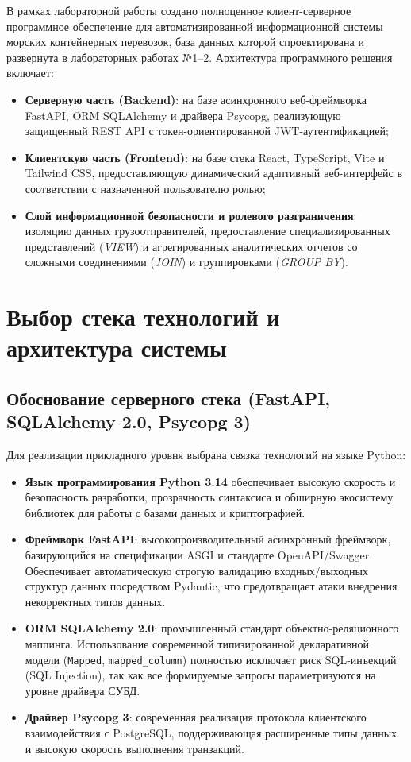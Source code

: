 \documentclass[a4paper,14pt]{article}
\begin{document}
В рамках лабораторной работы создано полноценное клиент-серверное программное обеспечение для автоматизированной информационной системы морских контейнерных перевозок, база данных которой спроектирована и развернута в лабораторных работах №1--2. Архитектура программного решения включает:
\begin{itemize}
    \item \textbf{Серверную часть (Backend)}: на базе асинхронного веб-фреймворка FastAPI, ORM SQLAlchemy и драйвера Psycopg, реализующую защищенный REST API с токен-ориентированной JWT-аутентификацией;
    \item \textbf{Клиентскую часть (Frontend)}: на базе стека React, TypeScript, Vite и Tailwind CSS, предоставляющую динамический адаптивный веб-интерфейс в соответствии с назначенной пользователю ролью;
    \item \textbf{Слой информационной безопасности и ролевого разграничения}: изоляцию данных грузоотправителей, предоставление специализированных представлений (\textit{VIEW}) и агрегированных аналитических отчетов со сложными соединениями (\textit{JOIN}) и группировками (\textit{GROUP BY}).
\end{itemize}

\newpage
\section{Выбор стека технологий и архитектура системы}

\subsection{Обоснование серверного стека (FastAPI, SQLAlchemy 2.0, Psycopg 3)}
Для реализации прикладного уровня выбрана связка технологий на языке Python:
\begin{itemize}
    \item \textbf{Язык программирования Python 3.14} обеспечивает высокую скорость и безопасность разработки, прозрачность синтаксиса и обширную экосистему библиотек для работы с базами данных и криптографией.
    \item \textbf{Фреймворк FastAPI}: высокопроизводительный асинхронный фреймворк, базирующийся на спецификации ASGI и стандарте OpenAPI/Swagger. Обеспечивает автоматическую строгую валидацию входных/выходных структур данных посредством Pydantic, что предотвращает атаки внедрения некорректных типов данных.
    \item \textbf{ORM SQLAlchemy 2.0}: промышленный стандарт объектно-реляционного маппинга. Использование современной типизированной декларативной модели (\texttt{Mapped}, \texttt{mapped\_column}) полностью исключает риск SQL-инъекций (SQL Injection), так как все формируемые запросы параметризуются на уровне драйвера СУБД.
    \item \textbf{Драйвер Psycopg 3}: современная реализация протокола клиентского взаимодействия с PostgreSQL, поддерживающая расширенные типы данных и высокую скорость выполнения транзакций.
\end{itemize}
\end{document}
